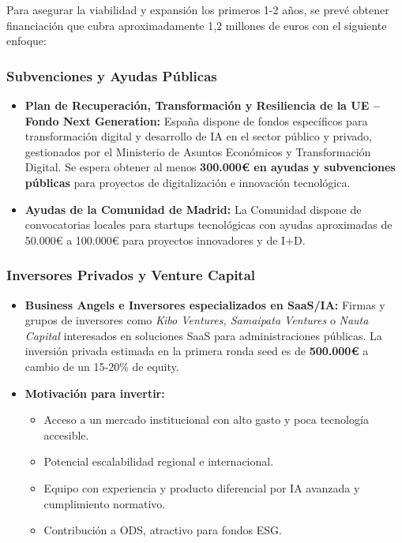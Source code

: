 Para asegurar la viabilidad y expansión los primeros 1-2 años, se prevé obtener financiación que cubra aproximadamente 1,2 millones de euros con el siguiente enfoque:

\subsubsection{Subvenciones y Ayudas Públicas}

\begin{itemize}
  \item \textbf{Plan de Recuperación, Transformación y Resiliencia de la UE – Fondo Next Generation:}  
  España dispone de fondos específicos para transformación digital y desarrollo de IA en el sector público y privado, gestionados por el Ministerio de Asuntos Económicos y Transformación Digital.  
  Se espera obtener al menos \textbf{300.000€ en ayudas y subvenciones públicas} para proyectos de digitalización e innovación tecnológica.
  
  \item \textbf{Ayudas de la Comunidad de Madrid:}  
  La Comunidad dispone de convocatorias locales para startups tecnológicas con ayudas aproximadas de 50.000€ a 100.000€ para proyectos innovadores y de I+D.
\end{itemize}

\subsubsection{Inversores Privados y Venture Capital}

\begin{itemize}
  \item \textbf{Business Angels e Inversores especializados en SaaS/IA:}  
  Firmas y grupos de inversores como \textit{Kibo Ventures, Samaipata Ventures} o \textit{Nauta Capital} interesados en soluciones SaaS para administraciones públicas.  
  La inversión privada estimada en la primera ronda seed es de \textbf{500.000€} a cambio de un 15-20\% de equity.
  
  \item \textbf{Motivación para invertir:}  
  \begin{itemize}
    \item Acceso a un mercado institucional con alto gasto y poca tecnología accesible.  
    \item Potencial escalabilidad regional e internacional.  
    \item Equipo con experiencia y producto diferencial por IA avanzada y cumplimiento normativo.  
    \item Contribución a ODS, atractivo para fondos ESG.
  \end{itemize}
\end{itemize}

